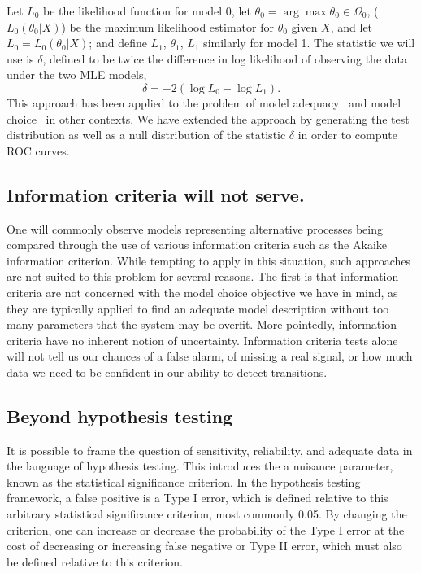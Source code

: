 \documentclass[authoryear,review,11pt]{elsarticle}
\begin{document}
Let $L_0$ be the likelihood function for model 0, 
let $\theta_0 = \arg \max \theta_0 \in \Omega_0$, ($L_0 (\theta_0 |X)$) 
be the maximum likelihood estimator for $\theta_0$ given $X$, and let $L_0 = L_0 (\theta_0 |X)$; 
and define $L_1$, $\theta_1$, $L_1$ similarly for model 1. 
The statistic we will use is $\delta$, 
defined to be twice the difference in log likelihood of observing the data under the two MLE models,
\begin{equation}\label{delta}
\delta = -2 (\log L_0 - \log L_1 ).
\end{equation}
This approach has been applied to the problem of model adequacy~\citep{Goldman1993} 
and model choice~\citep{Huelsenbeck1996} in other contexts.  
We have extended the approach by generating the test distribution 
as well as a null distribution of the statistic $\delta$ in order to compute ROC curves.  


%

\subsection*{Information criteria will not serve.}
One will commonly observe models representing alternative processes being compared through 
the use of various information criteria such as the Akaike information criterion.  
While tempting to apply in this situation, such approaches are not suited to this problem for several reasons.  
The first is that information criteria are not concerned with the model choice objective we have in mind,
as they are typically applied to find an adequate model description without too many parameters that the system may be overfit.  
More pointedly, information criteria have no inherent notion of uncertainty.
Information criteria tests alone will not tell us our chances of a false alarm, of missing a real signal, 
or how much data we need to be confident in our ability to detect transitions.   

\subsection*{Beyond hypothesis testing}
It is possible to frame the question of sensitivity, reliability, and adequate data in the language of hypothesis testing. 
This introduces the a nuisance parameter, known as the statistical significance criterion.  
In the hypothesis testing framework, a false positive is a Type I error, 
which is defined relative to this arbitrary statistical significance criterion, most commonly 0.05.  
By changing the criterion, one can increase or decrease the probability of the Type I error 
at the cost of decreasing or increasing false negative or Type II error, which must also be defined relative to this criterion.  
\end{document}
